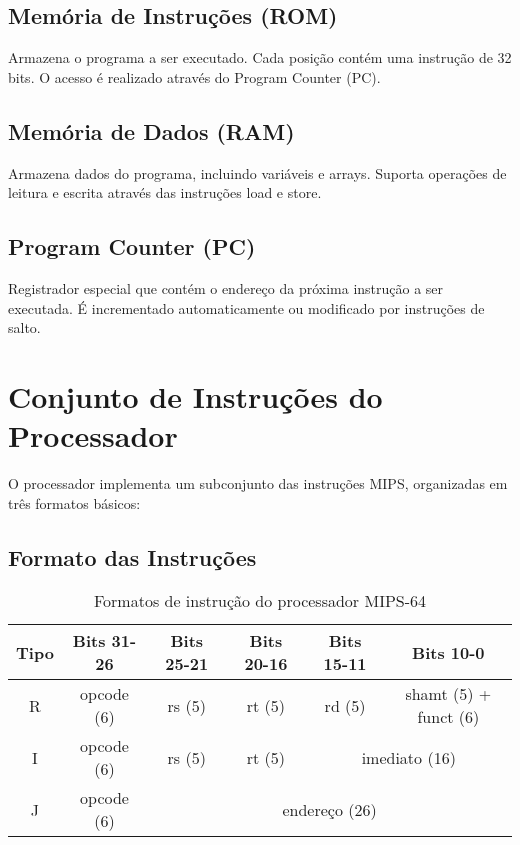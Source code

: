 \documentclass[
	12pt,				%
	oneside,
	a4paper,			%
	english,			%
	french,				%
	spanish,			%
	brazil,				%
	]{abntex2}
\begin{document}
\subsection{Memória de Instruções (ROM)}
Armazena o programa a ser executado. Cada posição contém uma instrução de 32 bits. O acesso é realizado através do Program Counter (PC).

\subsection{Memória de Dados (RAM)}
Armazena dados do programa, incluindo variáveis e arrays. Suporta operações de leitura e escrita através das instruções load e store.

\subsection{Program Counter (PC)}
Registrador especial que contém o endereço da próxima instrução a ser executada. É incrementado automaticamente ou modificado por instruções de salto.

\section{Conjunto de Instruções do Processador}

O processador implementa um subconjunto das instruções MIPS, organizadas em três formatos básicos:

\subsection{Formato das Instruções}

\begin{table}[H]
\centering
\caption{Formatos de instrução do processador MIPS-64}
\begin{tabular}{|c|c|c|c|c|c|}
\hline
\textbf{Tipo} & \textbf{Bits 31-26} & \textbf{Bits 25-21} & \textbf{Bits 20-16} & \textbf{Bits 15-11} & \textbf{Bits 10-0} \\
\hline
R & opcode (6) & rs (5) & rt (5) & rd (5) & shamt (5) + funct (6) \\
\hline
I & opcode (6) & rs (5) & rt (5) & \multicolumn{2}{c|}{imediato (16)} \\
\hline
J & opcode (6) & \multicolumn{4}{c|}{endereço (26)} \\
\hline
\end{tabular}
\end{table}
\end{document}
